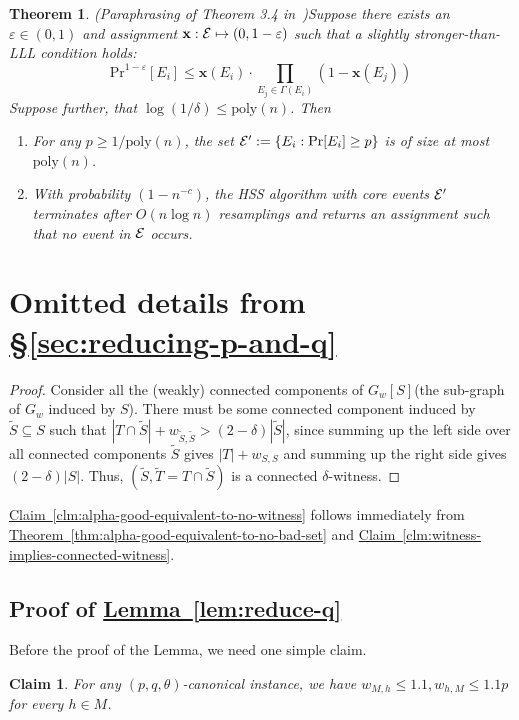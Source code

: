 \documentclass[11pt]{article}
\newtheorem{claim}{Claim}[section]
\newtheorem{theorem}{Theorem} \newtheorem{lemma}{Lemma}[section]
\newtheorem{claim}[lemma]{Claim}
\newcommand{\cardinal}[1]{\left|#1\right|}
\newcommand{\eps}{\varepsilon}
\renewcommand{\epsilon}{\varepsilon}
\newcommand{\poly}{\mathrm{poly}}
\newcommand{\x}{{\mathbf x}}
\renewcommand{\epsilon}{\varepsilon}
\newcommand{\Sec}[1]{\texorpdfstring{\hyperref[sec:#1]{\S\ref*{sec:#1}}}{\S\ref*{sec:#1}}} \newcommand{\Eqn}[1]{\texorpdfstring{\hyperref[eq:#1]{(\ref*{eq:#1})}}{(\ref*{eq:#1})}} \newcommand{\Thm}[1]{\texorpdfstring{\hyperref[thm:#1]{Theorem~\ref*{thm:#1}}}{Theorem~\ref*{thm:#1}}} \newcommand{\Lem}[1]{\texorpdfstring{\hyperref[lem:#1]{Lemma~\ref*{lem:#1}}}{Lemma~\ref*{lem:#1}}} \newcommand{\Def}[1]{\texorpdfstring{\hyperref[def:#1]{Definition~\ref*{def:#1}}}{Definition~\ref*{def:#1}}} \newcommand{\Clm}[1]{\texorpdfstring{\hyperref[clm:#1]{Claim~\ref*{clm:#1}}}{Claim~\ref*{clm:#1}}} \newcommand{\App}[1]{\hyperref[app:#1]{Appendix~\ref*{app:#1}}}
\begin{document}
\begin{theorem}(Paraphrasing of Theorem 3.4 in~\cite{HSS11})\label{thm:hss-2}
Suppose there exists an $\eps \in (0,1)$ and assignment $\x:{\cal E} \mapsto (0,1-\epsilon)$ such that a slightly stronger-than-LLL condition holds:
\begin{equation}
\label{eq:HSS}
{\mathrm{Pr}}^{1-\eps}[E_i]\leq \x(E_i)\cdot \prod_{E_j \in \Gamma(E_i)} \left(1-\x(E_j)\right)
\end{equation}
Suppose further, that $\log(1/\delta) \leq \poly(n)$. Then 
\begin{enumerate}
\item For any $p \geq 1/\poly(n)$, the set ${\cal E}' := \{E_i: \Pr[E_i] \geq p\}$ is of size at most $\poly(n)$.
\item With probability $(1-n^{-c})$, the HSS algorithm with core events ${\cal E}'$ terminates after $O(n\log n)$ resamplings and returns an assignment such that no event in $\cal E$ occurs.
\end{enumerate} 
\end{theorem}




\section{Omitted details from \Sec{reducing-p-and-q}}
\label{app:reducing-p-and-q}
\connectedwitness*
\begin{proof}
Consider all the (weakly) connected components of $G_w[S]$(the sub-graph of $G_w$ induced by $S$). There must be some connected component induced by $\tilde S \subseteq S$ such that $\cardinal{T \cap \tilde S} + w_{\tilde S, \tilde S} > (2-\delta)\cardinal{\tilde S}$, since summing up the left side over all connected components $\tilde S$ gives $\cardinal{T} + w_{S,S}$ and summing up the right side gives $(2-\delta)\cardinal{S}$. Thus, $\left(\tilde S, \tilde T =T \cap \tilde S\right)$ is a connected $\delta$-witness.
\end{proof}

\Clm{alpha-good-equivalent-to-no-witness} follows
immediately from \Thm{alpha-good-equivalent-to-no-bad-set} and \Clm{witness-implies-connected-witness}.

\subsection{Proof of \Lem{reduce-q}}
\label{app:reducing-p-and-q-1}

Before the proof of the Lemma, we need one simple claim. 
\begin{claim}
\label{clm:degree-is-small}
For any $(p, q, \theta)$-canonical instance, we have ${w_{M,h}} \leq 1.1, {w_{h,M}} \leq 1.1p$ for every $h \in M$. 
\end{claim}
\end{document}
